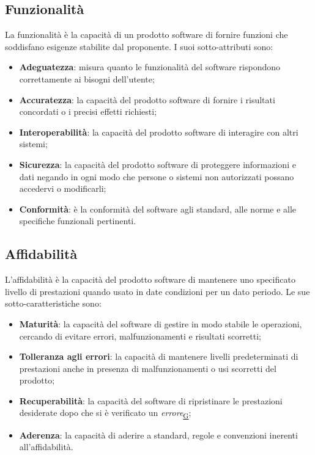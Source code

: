 \documentclass[a4paper,12pt]{article}
\begin{document}
\subsection{Funzionalità}
La funzionalità è la capacità di un prodotto software di fornire funzioni che soddisfano esigenze stabilite dal proponente. I suoi sotto-attributi sono:
\begin{itemize}
    \item \textbf{Adeguatezza}: misura quanto le funzionalità del software rispondono correttamente ai bisogni dell'utente;
    \item \textbf{Accuratezza}: la capacità del prodotto software di fornire i risultati concordati o i precisi effetti richiesti; 
    \item \textbf{Interoperabilità}: la capacità del prodotto software di interagire con altri sistemi;
    \item \textbf{Sicurezza}: la capacità del prodotto software di proteggere informazioni e dati negando in ogni modo che persone o sistemi non autorizzati possano accedervi o modificarli;
    \item \textbf{Conformità}: è la conformità del software agli standard, alle norme e alle specifiche funzionali pertinenti.
\end{itemize}

\subsection{Affidabilità}
L'affidabilità è la capacità del prodotto software di mantenere uno specificato livello di prestazioni quando usato in date condizioni per un dato periodo. Le sue sotto-caratteristiche sono:
\begin{itemize}
    \item \textbf{Maturità}: la capacità del software di gestire in modo stabile le operazioni, cercando di evitare errori, malfunzionamenti e risultati scorretti;
    \item \textbf{Tolleranza agli errori}: la capacità di mantenere livelli predeterminati di prestazioni anche in presenza di malfunzionamenti o usi scorretti del prodotto;
    \item \textbf{Recuperabilità}: la capacità del software di ripristinare le prestazioni desiderate dopo che si è verificato un \textit{errore}\textsubscript{\href{https://atlasteam9.github.io/Atlas/glossario.html\#Errore}{G}};
    \item \textbf{Aderenza}: la capacità di aderire a standard, regole e convenzioni inerenti all'affidabilità.
\end{itemize}
\end{document}
